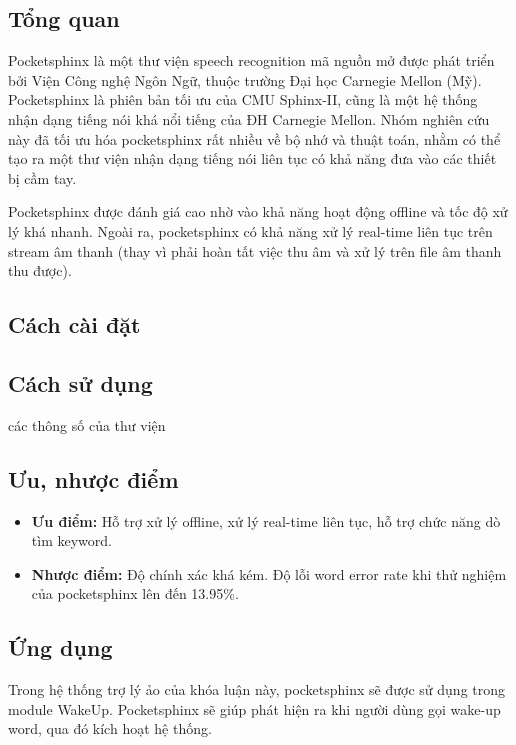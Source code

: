 \subsection{Tổng quan}

Pocketsphinx là một thư viện speech recognition mã nguồn mở được phát triển bởi Viện Công nghệ Ngôn Ngữ, thuộc trường Đại học Carnegie Mellon (Mỹ). Pocketsphinx là phiên bản tối ưu của CMU Sphinx-II, cũng là một hệ thống nhận dạng tiếng nói khá nổi tiếng của ĐH Carnegie Mellon. Nhóm nghiên cứu này đã tối ưu hóa pocketsphinx rất nhiều về bộ nhớ và thuật toán, nhằm có thể tạo ra một thư viện nhận dạng tiếng nói liên tục có khả năng đưa vào các thiết bị cầm tay.

Pocketsphinx được đánh giá cao nhờ vào khả năng hoạt động offline và tốc độ xử lý khá nhanh. Ngoài ra, pocketsphinx có khả năng xử lý real-time liên tục trên stream âm thanh (thay vì phải hoàn tất việc thu âm và xử lý trên file âm thanh thu được).

\subsection{Cách cài đặt}

\subsection{Cách sử dụng}

các thông số của thư viện

\subsection{Ưu, nhược điểm}

\begin{itemize}
    \item \textbf{Ưu điểm:} Hỗ trợ xử lý offline, xử lý real-time liên tục, hỗ trợ chức năng dò tìm keyword.
    \item \textbf{Nhược điểm:} Độ chính xác khá kém. Độ lỗi word error rate khi thử nghiệm của pocketsphinx lên đến 13.95\%\cite{huggins2006pocketsphinx}.
\end{itemize}

\subsection{Ứng dụng}

Trong hệ thống trợ lý ảo của khóa luận này, pocketsphinx sẽ được sử dụng trong module WakeUp. Pocketsphinx sẽ giúp phát hiện ra khi người dùng gọi wake-up word, qua đó kích hoạt hệ thống.

